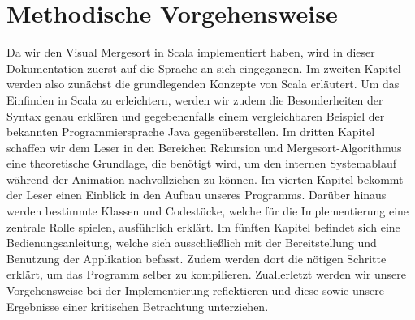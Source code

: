 \section{Methodische Vorgehensweise}
Da wir den Visual Mergesort in Scala implementiert haben, wird in dieser Dokumentation zuerst auf die Sprache an sich eingegangen. Im zweiten Kapitel werden also zunächst die grundlegenden Konzepte von Scala erläutert. Um das Einfinden in Scala zu erleichtern, werden wir zudem die Besonderheiten der Syntax genau erklären und gegebenenfalls einem vergleichbaren Beispiel der bekannten Programmiersprache Java gegenüberstellen. Im dritten Kapitel schaffen wir dem Leser in den Bereichen Rekursion und Mergesort-Algorithmus eine theoretische Grundlage, die benötigt wird, um den internen Systemablauf während der Animation nachvollziehen zu können. Im vierten Kapitel bekommt der Leser einen Einblick in den Aufbau unseres Programms. Darüber hinaus werden bestimmte Klassen und Codestücke, welche für die Implementierung eine zentrale Rolle spielen, ausführlich erklärt. Im fünften Kapitel befindet sich eine Be\-die\-nungs\-an\-lei\-tung, welche sich ausschließlich mit der Bereitstellung und Benutzung der Applikation befasst. Zudem werden dort die nötigen Schritte erklärt, um das Programm selber zu kompilieren. Zuallerletzt werden wir unsere Vorgehensweise bei der Implementierung reflektieren und diese sowie unsere Ergebnisse einer kritischen Betrachtung unterziehen.
